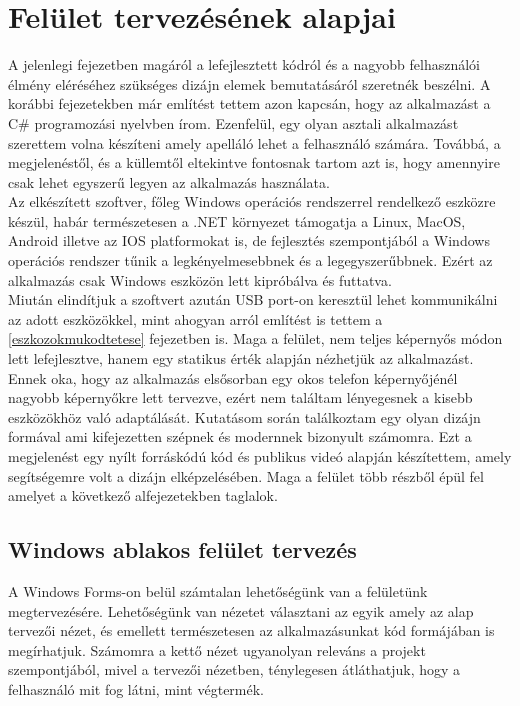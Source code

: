\documentclass[tocnopagenum]{thesis-ekf}
\theoremstyle{definition}
\theoremstyle{remark}
\begin{document}
	\section{Felület tervezésének alapjai}
	A jelenlegi fejezetben magáról a lefejlesztett kódról és a nagyobb felhasználói élmény eléréséhez szükséges dizájn elemek bemutatásáról szeretnék beszélni.
	A korábbi fejezetekben már említést tettem azon kapcsán, hogy az alkalmazást a C\# programozási nyelvben írom. Ezenfelül, egy olyan asztali alkalmazást szerettem volna készíteni amely apelláló lehet a felhasználó számára. Továbbá, a megjelenéstől, és a küllemtől eltekintve fontosnak tartom azt is, hogy amennyire csak lehet egyszerű legyen az alkalmazás használata.
	\\
	Az elkészített szoftver, főleg Windows operációs rendszerrel rendelkező eszközre készül, habár természetesen a .NET környezet támogatja a Linux, MacOS, Android illetve az IOS platformokat is, de fejlesztés szempontjából a Windows operációs rendszer tűnik a legkényelmesebbnek és a legegyszerűbbnek.\cite{altexsoft} Ezért az alkalmazás csak Windows eszközön lett kipróbálva és futtatva.
	\\ 
	Miután elindítjuk a szoftvert azután USB port-on keresztül lehet kommunikálni az adott eszközökkel, mint ahogyan arról említést is tettem a \ref{eszkozokmukodtetese} fejezetben is.
	Maga a felület, nem teljes képernyős módon lett lefejlesztve, hanem egy statikus érték alapján nézhetjük az alkalmazást.
	Ennek oka, hogy az alkalmazás elsősorban egy okos telefon képernyőjénél nagyobb képernyőkre lett tervezve, ezért nem találtam lényegesnek a kisebb eszközökhöz való adaptálását.
	Kutatásom során találkoztam egy olyan dizájn formával ami kifejezetten szépnek és modernnek bizonyult számomra.\cite{modernUI} 
	Ezt a megjelenést egy nyílt forráskódú kód és publikus videó alapján készítettem, amely segítségemre volt a dizájn elképzelésében.\cite{rjcode}
	Maga a felület több részből épül fel amelyet a következő alfejezetekben taglalok.
	\\
	\subsection{Windows ablakos felület tervezés}
	A Windows Forms-on belül számtalan lehetőségünk van a felületünk  megtervezésére. Lehetőségünk van nézetet választani az egyik amely az alap tervezői nézet, és emellett természetesen az alkalmazásunkat kód formájában is megírhatjuk. Számomra a kettő nézet ugyanolyan releváns a projekt szempontjából, mivel a tervezői nézetben, ténylegesen átláthatjuk, hogy a felhasználó mit fog látni, mint végtermék.
	
\end{document}
